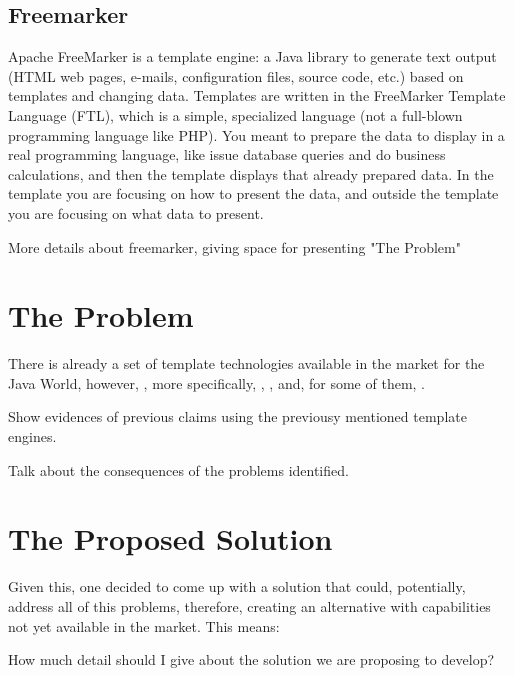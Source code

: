 \subsection{Freemarker}

\begin{review}
Apache FreeMarker is a template engine: a Java library to generate text output (HTML web pages, e-mails, configuration files, source code, etc.) based on templates and changing data. Templates are written in the FreeMarker Template Language (FTL), which is a simple, specialized language (not a full-blown programming language like PHP). You meant to prepare the data to display in a real programming language, like issue database queries and do business calculations, and then the template displays that already prepared data. In the template you are focusing on how to present the data, and outside the template you are focusing on what data to present.

\begin{expand}
    More details about freemarker, giving space for presenting "The Problem"
\end{expand}
\end{review}

\section{The Problem}

There is already a set of template technologies available in the market for the Java World, however, , more specifically, , ,  and, for some of them, . 

\begin{expand}
    Show evidences of previous claims using the previousy mentioned template engines.
\end{expand}

\begin{expand}
    Talk about the consequences of the problems identified.
\end{expand}

\section{The Proposed Solution}

Given this, one decided to come up with a solution that could, potentially, address all of this problems, therefore, creating an alternative with capabilities not yet available in the market. This means:


\begin{orientador}
    How much detail should I give about the solution we are proposing to develop?
\end{orientador}